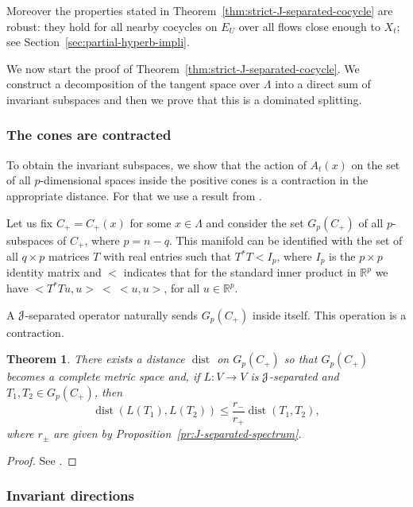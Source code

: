 \documentclass[12pt,reqno]{amsart}
\numberwithin{equation}{section}
\theoremstyle{plain}
\newtheorem{theorem}{Theorem}[section]
\theoremstyle{definition}
\newcommand{\RR}{{\mathbb R}}
\newcommand{\dist}{\operatorname{dist}}
\newcommand{\J}{\EuScript{J}}
\begin{document}
Moreover the properties stated in
Theorem~\ref{thm:strict-J-separated-cocycle} are robust:
they hold for all nearby cocycles on $E_U$ over all flows
close enough to $X_t$; see
Section~\ref{sec:partial-hyperb-impli}.

We now start the proof of
Theorem~\ref{thm:strict-J-separated-cocycle}. We construct a
decomposition of the tangent space over $\Lambda$ into a
direct sum of invariant subspaces and then we prove that
this is a dominated splitting.

\subsubsection{The cones are contracted}
\label{sec:project-metrics}

To obtain the invariant subspaces, we show that the action
of $A_{t}(x)$ on the set of all $p$-dimensional spaces
inside the positive cones is a contraction in the
appropriate distance. For that we use a result from
\cite{Wojtk01}.

Let us fix $C_+=C_+(x)$ for some $x\in\Lambda$ and consider
the set $G_p(C_+)$ of all $p$-subspaces of $C_+$, where
$p=n-q$. This manifold can be identified with the set of
all $q\times p$ matrices $T$ with real entries such that
$T^*T<I_p$, where $I_p$ is the $p\times p$ identity matrix
and $<$ indicates that for the standard inner product in
$\RR^p$ we have $<T^*T u,u> \ < \ <u,u>$, for all $u\in\RR^p$.

A $\J$-separated operator naturally sends $G_p(C_+)$ inside
itself. This operation is a contraction.

\begin{theorem}
  \label{thm:proj-contr}
  There exists a distance $\dist$ on $G_p(C_+)$ so that
  $G_p(C_+)$ becomes a complete metric space and,
  if $L:V\to V$ is $\J$-separated and $T_1,T_2\in G_p(C_+)$,
  then
  $$
  \dist(L(T_1),L(T_2))\le \frac{r_-}{r_+}\dist(T_1,T_2),
  $$
  where $r_\pm$ are given by Proposition~\ref{pr:J-separated-spectrum}.
\end{theorem}

\begin{proof}
  See \cite[Theorem 1.6]{Wojtk01}.
\end{proof}






\subsubsection{Invariant directions}
\label{sec:invari-direct}
\end{document}
